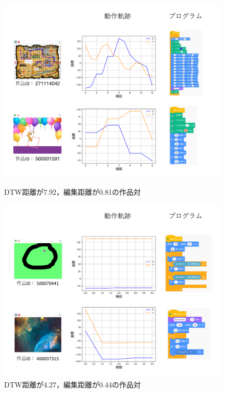 \documentclass[T,J]{fose} %
\begin{document}
\begin{figure}[t]
  \begin{minipage}[b]{0.45\linewidth}
    \centering
	\includegraphics[width=1.0\linewidth]{Okamoto_fig/quadrant-1.pdf}
    \caption{DTW距離が7.92，編集距離が0.81の作品対}
    \label{fig:distance-boxplot1}
  \end{minipage}
  \begin{minipage}[b]{0.45\linewidth}
    \centering
	\includegraphics[width=1.0\linewidth]{Okamoto_fig/quadrant-2.pdf}
	\caption{DTW距離が4.27，編集距離が0.44の作品対}
	\label{fig:distance-boxplot2}
  \end{minipage}



\end{figure}
\end{document}
